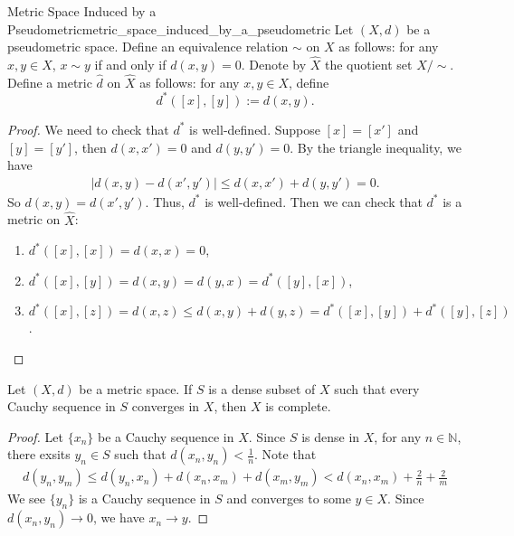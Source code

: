 \documentclass{report}
\begin{document}
\begin{definition}{Metric Space Induced by a Pseudometric}{metric_space_induced_by_a_pseudometric}
	Let $(X,d)$ be a pseudometric space. Define an equivalence relation $\sim$ on $X$ as follows: for any $x,y\in X$, $x\sim y$ if and only if $d(x,y)=0$. Denote by $\widehat{X}$ the quotient set $X/\sim$. Define a metric $\hat{d}$ on $\widehat{X}$ as follows: for any $x,y\in X$, define
	\[
		d^*([x],[y]):=d(x,y).
	\]
\end{definition}
\begin{proof}
	We need to check that $d^*$ is well-defined. Suppose $[x]=[x']$ and $[y]=[y']$, then $d(x,x')=0$ and $d(y,y')=0$. By the triangle inequality, we have
	\begin{align*}
		|d(x,y)-d(x',y')|\le d(x,x')+d(y,y')=0.
	\end{align*}
	So $d(x,y)=d(x',y')$. Thus, $d^*$ is well-defined.
	Then we can check that $d^*$ is a metric on $\widehat{X}$:
	\begin{enumerate}
		\item $d^*([x],[x])=d(x,x)=0$,
		\item $d^*([x],[y])=d(x,y)=d(y,x)=d^*([y],[x])$,
		\item $d^*([x],[z])=d(x,z)\le d(x,y)+d(y,z)=d^*([x],[y])+d^*([y],[z])$.
	\end{enumerate}
\end{proof}

\begin{lemma}{}{}
	Let $(X, d)$ be a metric space. If $S$ is a dense subset of $X$ such that every Cauchy sequence in $S$ converges in $X$, then $X$ is complete.
\end{lemma}
\begin{proof}
	Let $\{x_n\}$ be a Cauchy sequence in $X$. Since $S$ is dense in $X$, for any $n\in\mathbb{N}$, there exsits $y_n\in S$ such that $d(x_n,y_n)<\frac{1}{n}$. Note that
	\begin{align*}
		d(y_n,y_m)\le d(y_n,x_n)+d(x_n,x_m)+d(x_m,y_m)<d(x_n,x_m)+\frac{2}{n}+\frac{2}{m}
	\end{align*}
	We see $\{y_n\}$ is a Cauchy sequence in $S$ and converges to some $y\in X$. Since $d(x_n,y_n)\to 0$, we have $x_n\to y$.
\end{proof}
\end{document}
